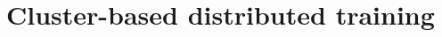 \documentclass[a4paper]{article}
\begin{document}

\section{Cluster-based distributed training}
\end{document}
